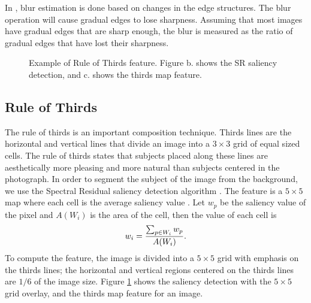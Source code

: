 \documentclass[conference,a4paper]{IEEEtran}
\begin{document}
  In \cite{tong2004blur}, blur estimation is done based on changes in the edge structures.  The blur operation will cause gradual edges to lose sharpness.  Assuming that most images have gradual edges that are sharp enough, the blur is measured as the ratio of gradual edges that have lost their sharpness.
\begin{figure}[t!]
  \centering
  \caption{
    Example of Rule of Thirds feature.  Figure b. shows the SR saliency detection, and c. shows the thirds map feature.
  }
  \label{fig:rot}
\end{figure}


  \subsection{Rule of Thirds}
  The rule of thirds is an important composition technique.  Thirds lines are the horizontal and vertical lines that divide an image into a $3\times3$ grid of equal sized cells.  The rule of thirds states that subjects placed along these lines are aesthetically more pleasing and more natural than subjects centered in the photograph.  In order to segment the subject of the image from the background, we use the Spectral Residual saliency detection algorithm \cite{hou2007saliency}.  The feature is a $5\times5$ map where each cell is the average saliency value \cite{mai2011rule}.  Let $w_p$ be the saliency value of the pixel and $A(W_i)$ is the area of the cell, then the value of each cell is
  \begin{equation}
    w_i = {\sum_{p \in W_i} w_p \over A(W_i)} .
  \end{equation}
  To compute the feature, the image is divided into a $5\times5$ grid with emphasis on the thirds lines; the horizontal and vertical regions centered on the thirds lines are $1/6$ of the image size.  Figure \ref{fig:rot} shows the saliency detection with the $5\times5$ grid overlay, and the thirds map feature for an image.
\end{document}
